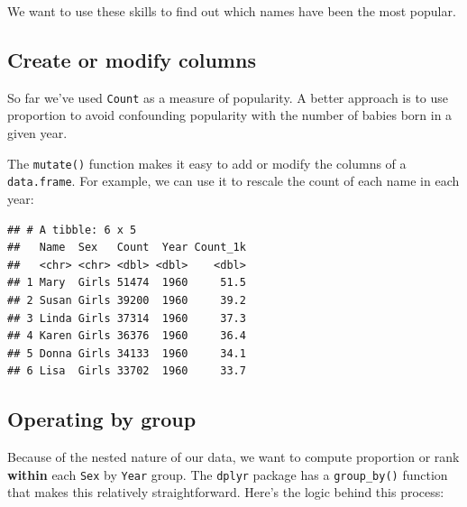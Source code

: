 \documentclass[]{book}
\newenvironment{Shaded}{\begin{snugshade}}{\end{snugshade}}
\newcommand{\KeywordTok}[1]{\textcolor[rgb]{0.13,0.29,0.53}{\textbf{#1}}}
\newcommand{\DataTypeTok}[1]{\textcolor[rgb]{0.13,0.29,0.53}{#1}}
\newcommand{\DecValTok}[1]{\textcolor[rgb]{0.00,0.00,0.81}{#1}}
\newcommand{\StringTok}[1]{\textcolor[rgb]{0.31,0.60,0.02}{#1}}
\newcommand{\OperatorTok}[1]{\textcolor[rgb]{0.81,0.36,0.00}{\textbf{#1}}}
\newcommand{\NormalTok}[1]{#1}
\begin{document}
We want to use these skills to find out which names have been the most
popular.

\subsection{Create or modify columns}\label{create-or-modify-columns}

So far we've used \texttt{Count} as a measure of popularity. A better
approach is to use proportion to avoid confounding popularity with the
number of babies born in a given year.

The \texttt{mutate()} function makes it easy to add or modify the
columns of a \texttt{data.frame}. For example, we can use it to rescale
the count of each name in each year:

\begin{Shaded}
\end{Shaded}

\begin{verbatim}
## # A tibble: 6 x 5
##   Name  Sex   Count  Year Count_1k
##   <chr> <chr> <dbl> <dbl>    <dbl>
## 1 Mary  Girls 51474  1960     51.5
## 2 Susan Girls 39200  1960     39.2
## 3 Linda Girls 37314  1960     37.3
## 4 Karen Girls 36376  1960     36.4
## 5 Donna Girls 34133  1960     34.1
## 6 Lisa  Girls 33702  1960     33.7
\end{verbatim}

\subsection{Operating by group}\label{operating-by-group}

Because of the nested nature of our data, we want to compute proportion
or rank \textbf{within} each \texttt{Sex} by \texttt{Year} group. The
\texttt{dplyr} package has a \texttt{group\_by()} function that makes
this relatively straightforward. Here's the logic behind this process:
\end{document}
